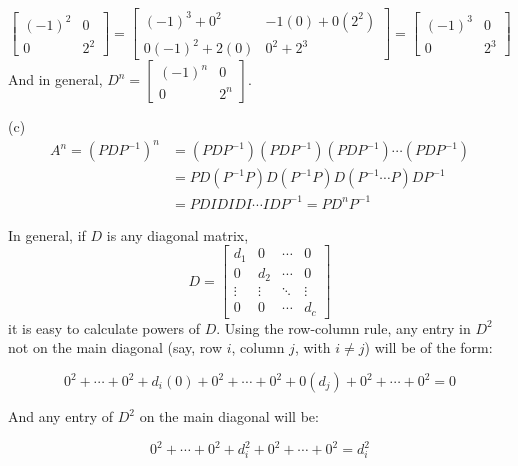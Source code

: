 \documentclass[11pt, letterpaper]{report}
\newenvironment{notes}{}{}
\newenvironment{book}{}{}
\begin{document}
\begin{book}
\[\begin{bmatrix}
(-1)^2 & 0 \\
0 & 2^{2}
\end{bmatrix} = \begin{bmatrix}
(-1)^3 + 0^2 & -1(0) + 0(2^2) \\
0(-1)^2 + 2(0) & 0^2+2^3
\end{bmatrix} = \begin{bmatrix}
(-1)^3 & 0 \\
0 & 2^3
\end{bmatrix}\]
And in general, $D^n = \begin{bmatrix}
(-1)^n & 0 \\
0 & 2^n
\end{bmatrix}$.

(c)
\begin{align*}
A^n=( PDP^{-1} )^{n} &= ( PDP^{-1} )( PDP^{-1} )( PDP^{-1} ) \cdots( PDP^{-1} ) \\
&=PD ( P^{-1}P )D ( P^{-1}P ) D ( P^{-1} \cdots P )DP^{-1} \\
&= PDIDIDI\cdots IDP^{-1} = PD^nP^{-1}
\end{align*}
\blacksquare
\end{book}

\begin{notes}
\hspace{1pt}
\vfill \hspace{1pt}
\end{notes}

In general, if $D$ is any diagonal matrix,
\[D= \begin{bmatrix}
d_1 & 0 & \cdots & 0 \\
0 & d_2 & \cdots & 0 \\
\vdots & \vdots & \ddots & \vdots \\
0 & 0 & \cdots & d_c
\end{bmatrix}\]
it is easy to calculate powers of $D$. Using the row-column rule, any entry in $D^2$ not on the main diagonal (say, row $i$, column $j$, with $i \ne j$) will be of the form:

\begin{book}
 \[0^2+\cdots+0^2+d_i(0) + 0^2+\cdots+0^2 +0(d_j)+0^2+\cdots+0^2 = 0\]
\end{book}

\begin{notes}

\vspace{2em}
\end{notes}
And any entry of $D^{2}$ on the main diagonal will be:

\begin{book}
\[ 0^2+ \cdots + 0^{2}+ d_i^2+ 0^2+\cdots+0^2=d_i^2 \]
\end{book}
\end{document}

